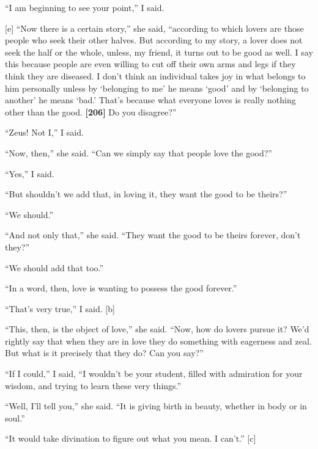 “I am beginning to see your point,” I said.

{[}e{]} “Now there is a certain story,” she said, “according to which
lovers are those people who seek their other halves. But according to my
story, a lover does not seek the half or the whole, unless, my friend,
it turns out to be good as well. I say this because people are even
willing to cut off their own arms and legs if they think they are
diseased. I don't think an individual takes joy in what belongs to him
personally unless by ‘belonging to me' he means ‘good' and by ‘belonging
to another' he means ‘bad.' That's because what everyone loves is really
nothing other than the good. {\bf {[}206{]}} Do you disagree?”

“Zeus! Not I,” I said.

“Now, then,” she said. “Can we simply say that people love the good?”

“Yes,” I said.

“But shouldn't we add that, in loving it, they want the good to be
theirs?”

“We should.”

“And not only that,” she said. “They want the good to be theirs forever,
don't they?”

“We should add that too.”

“In a word, then, love is wanting to possess the good forever.”

“That's very true,” I said. {[}b{]}

“This, then, is the object of
love,” she said.
“Now, how do lovers pursue it? We'd rightly say that when they are in
love they do something with eagerness and zeal. But what is it precisely
that they do? Can you say?”

“If I could,” I said, “I wouldn't be your student, filled with
admiration for your wisdom, and trying to learn these very things.”

“Well, I'll tell you,” she said. “It is giving birth in
beauty, whether in
body or in soul.”

“It would take divination to figure out what you mean. I can't.” {[}c{]}

